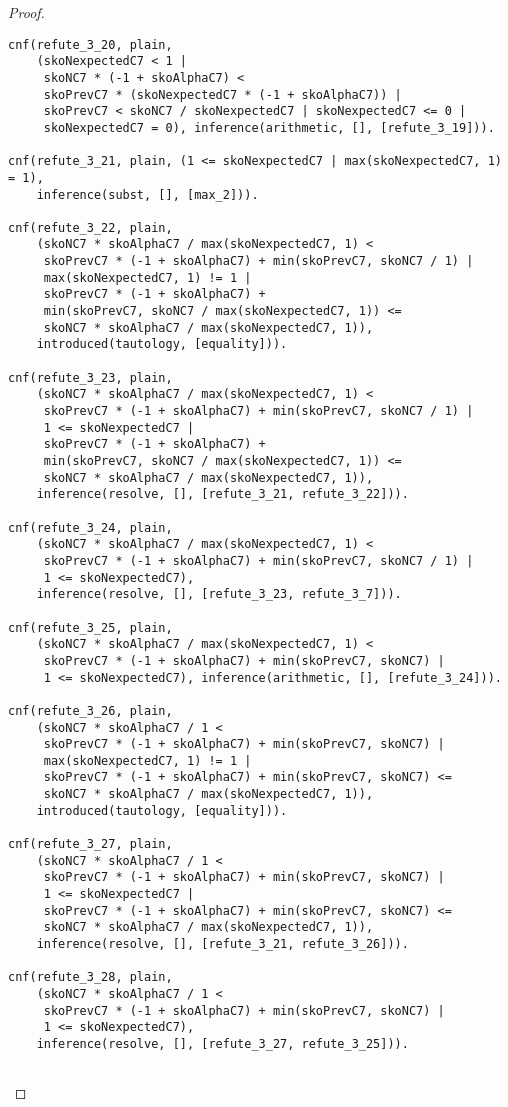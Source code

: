 \begin{proof}
\begin{verbatim}
cnf(refute_3_20, plain,
    (skoNexpectedC7 < 1 |
     skoNC7 * (-1 + skoAlphaC7) <
     skoPrevC7 * (skoNexpectedC7 * (-1 + skoAlphaC7)) |
     skoPrevC7 < skoNC7 / skoNexpectedC7 | skoNexpectedC7 <= 0 |
     skoNexpectedC7 = 0), inference(arithmetic, [], [refute_3_19])).

cnf(refute_3_21, plain, (1 <= skoNexpectedC7 | max(skoNexpectedC7, 1) = 1),
    inference(subst, [], [max_2])).

cnf(refute_3_22, plain,
    (skoNC7 * skoAlphaC7 / max(skoNexpectedC7, 1) <
     skoPrevC7 * (-1 + skoAlphaC7) + min(skoPrevC7, skoNC7 / 1) |
     max(skoNexpectedC7, 1) != 1 |
     skoPrevC7 * (-1 + skoAlphaC7) +
     min(skoPrevC7, skoNC7 / max(skoNexpectedC7, 1)) <=
     skoNC7 * skoAlphaC7 / max(skoNexpectedC7, 1)),
    introduced(tautology, [equality])).

cnf(refute_3_23, plain,
    (skoNC7 * skoAlphaC7 / max(skoNexpectedC7, 1) <
     skoPrevC7 * (-1 + skoAlphaC7) + min(skoPrevC7, skoNC7 / 1) |
     1 <= skoNexpectedC7 |
     skoPrevC7 * (-1 + skoAlphaC7) +
     min(skoPrevC7, skoNC7 / max(skoNexpectedC7, 1)) <=
     skoNC7 * skoAlphaC7 / max(skoNexpectedC7, 1)),
    inference(resolve, [], [refute_3_21, refute_3_22])).

cnf(refute_3_24, plain,
    (skoNC7 * skoAlphaC7 / max(skoNexpectedC7, 1) <
     skoPrevC7 * (-1 + skoAlphaC7) + min(skoPrevC7, skoNC7 / 1) |
     1 <= skoNexpectedC7),
    inference(resolve, [], [refute_3_23, refute_3_7])).

cnf(refute_3_25, plain,
    (skoNC7 * skoAlphaC7 / max(skoNexpectedC7, 1) <
     skoPrevC7 * (-1 + skoAlphaC7) + min(skoPrevC7, skoNC7) |
     1 <= skoNexpectedC7), inference(arithmetic, [], [refute_3_24])).

cnf(refute_3_26, plain,
    (skoNC7 * skoAlphaC7 / 1 <
     skoPrevC7 * (-1 + skoAlphaC7) + min(skoPrevC7, skoNC7) |
     max(skoNexpectedC7, 1) != 1 |
     skoPrevC7 * (-1 + skoAlphaC7) + min(skoPrevC7, skoNC7) <=
     skoNC7 * skoAlphaC7 / max(skoNexpectedC7, 1)),
    introduced(tautology, [equality])).

cnf(refute_3_27, plain,
    (skoNC7 * skoAlphaC7 / 1 <
     skoPrevC7 * (-1 + skoAlphaC7) + min(skoPrevC7, skoNC7) |
     1 <= skoNexpectedC7 |
     skoPrevC7 * (-1 + skoAlphaC7) + min(skoPrevC7, skoNC7) <=
     skoNC7 * skoAlphaC7 / max(skoNexpectedC7, 1)),
    inference(resolve, [], [refute_3_21, refute_3_26])).

cnf(refute_3_28, plain,
    (skoNC7 * skoAlphaC7 / 1 <
     skoPrevC7 * (-1 + skoAlphaC7) + min(skoPrevC7, skoNC7) |
     1 <= skoNexpectedC7),
    inference(resolve, [], [refute_3_27, refute_3_25])).


\end{verbatim}
\end{proof}
